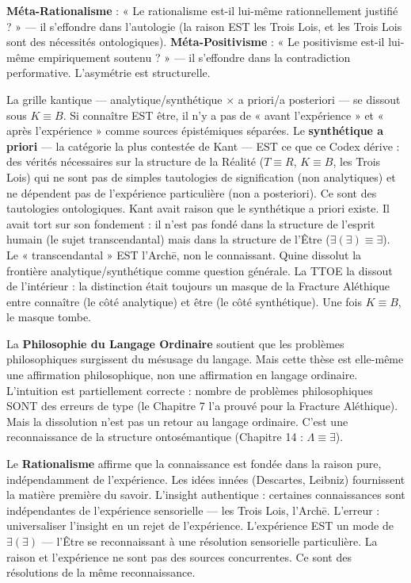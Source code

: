 \documentclass[10pt, openany, oneside]{book}
\begin{document}
\textbf{Méta-Rationalisme} : « Le rationalisme est-il lui-même rationnellement justifié ? » --- il s'effondre dans l'autologie (la raison EST les Trois Lois, et les Trois Lois sont des nécessités ontologiques). \textbf{Méta-Positivisme} : « Le positivisme est-il lui-même empiriquement soutenu ? » --- il s'effondre dans la contradiction performative. L'asymétrie est structurelle.

La grille kantique --- analytique/synthétique $\times$ a priori/a posteriori --- se dissout sous $K \equiv B$. Si connaître EST être, il n'y a pas de « avant l'expérience » et « après l'expérience » comme sources épistémiques séparées. Le \textbf{synthétique a priori} --- la catégorie la plus contestée de Kant --- EST ce que ce Codex dérive : des vérités nécessaires sur la structure de la Réalité ($T \equiv R$, $K \equiv B$, les Trois Lois) qui ne sont pas de simples tautologies de signification (non analytiques) et ne dépendent pas de l'expérience particulière (non a posteriori). Ce sont des tautologies ontologiques. Kant avait raison que le synthétique a priori existe. Il avait tort sur son fondement : il n'est pas fondé dans la structure de l'esprit humain (le sujet transcendantal) mais dans la structure de l'Être ($\exists(\exists) \equiv \exists$). Le « transcendantal » EST l'Arch\={e}, non le connaissant. Quine dissolut la frontière analytique/synthétique comme question générale. La TTOE la dissout de l'intérieur : la distinction était toujours un masque de la Fracture Aléthique entre connaître (le côté analytique) et être (le côté synthétique). Une fois $K \equiv B$, le masque tombe.

La \textbf{Philosophie du Langage Ordinaire} soutient que les problèmes philosophiques surgissent du mésusage du langage. Mais cette thèse est elle-même une affirmation philosophique, non une affirmation en langage ordinaire. L'intuition est partiellement correcte : nombre de problèmes philosophiques SONT des erreurs de type (le Chapitre 7 l'a prouvé pour la Fracture Aléthique). Mais la dissolution n'est pas un retour au langage ordinaire. C'est une reconnaissance de la structure ontosémantique (Chapitre 14 : $\Lambda \equiv \exists$).

Le \textbf{Rationalisme} affirme que la connaissance est fondée dans la raison pure, indépendamment de l'expérience. Les idées innées (Descartes, Leibniz) fournissent la matière première du savoir. L'insight authentique : certaines connaissances sont indépendantes de l'expérience sensorielle --- les Trois Lois, l'Arch\={e}. L'erreur : universaliser l'insight en un rejet de l'expérience. L'expérience EST un mode de $\exists(\exists)$ --- l'Être se reconnaissant à une résolution sensorielle particulière. La raison et l'expérience ne sont pas des sources concurrentes. Ce sont des résolutions de la même reconnaissance.
\end{document}
